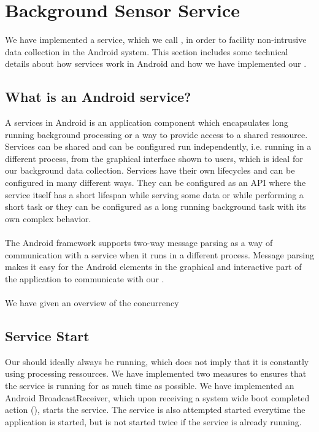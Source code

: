 
\section{Background Sensor Service}
\label{sec:background_sensor_service}
We have implemented a service, which we call , in order to facility non-intrusive data collection in the Android system.
This section includes some technical details about how services work in Android and how we have implemented our . 

\subsection{What is an Android service?}
A services in Android is an application component which encapsulates long running background processing or a way to provide access to a shared ressource. Services can be shared and can be configured run independently, i.e. running in a different process, from the graphical interface shown to users, which is ideal for our background data collection. Services have their own lifecycles and can be configured in many different ways. They can be configured as an API where the service itself has a short lifespan while serving some data or while performing a short task or they can be configured as a long running background task with its own complex behavior.
\\\\
The Android framework supports two-way message parsing as a way of communication with a service when it runs in a different process. Message parsing makes it easy for the Android  elements in the graphical and interactive part of the application to communicate with our .
\\\\
We have given an overview of the concurrency 

\subsection{Service Start}
Our  should ideally always be running, which does not imply that it is constantly using processing ressources. We have implemented two measures to ensures that the service is running for as much time as possible. We have implemented an Android BroadcastReceiver, which upon receiving a system wide boot completed action (), starts the service. The service is also attempted started everytime the application is started, but is not started twice if the service is already running. 

